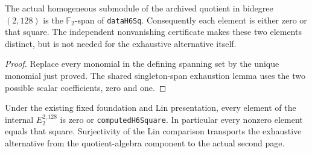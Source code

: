 \begin{proposition}
  \label{prop:lin-square-component-two-elements}
  \leanok
  The actual homogeneous submodule of the archived quotient in bidegree
  $(2,128)$ is the $\mathbb F_2$-span of \texttt{dataH6Sq}. Consequently
  each element is either zero or that square. The independent nonvanishing
  certificate makes these two elements distinct, but is not needed for
  the exhaustive alternative itself.
\end{proposition}
\begin{proof}
  Replace every monomial in the defining spanning set by the unique
  monomial just proved. The shared singleton-span exhaustion lemma uses the
  two possible scalar coefficients, zero and one.
  \leanok
\end{proof}

\begin{proposition}
  \label{prop:h6-internal-square-unique}
  \notready
  Under the existing fixed foundation and Lin presentation, every element
  of the internal $E_2^{2,128}$ is zero or \texttt{computedH6Square}.
  In particular every nonzero element equals that square. Surjectivity of
  the Lin comparison transports the exhaustive alternative from the
  quotient-algebra component to the actual second page.
\end{proposition}

